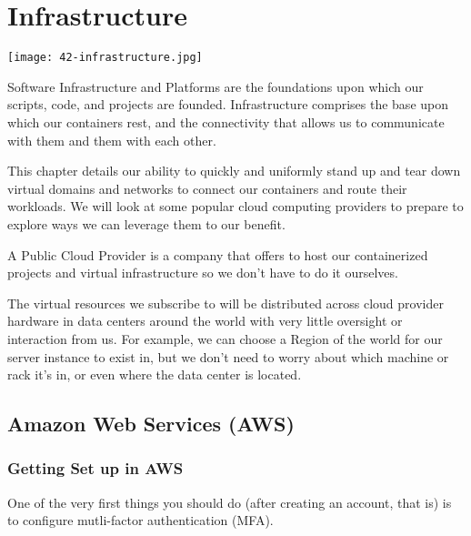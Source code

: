 \chapter{Infrastructure}

\justifying
\texttt{[image: 42-infrastructure.jpg]}

\justifying
Software Infrastructure and Platforms are the foundations upon which our
scripts, code, and projects are founded. Infrastructure comprises the
base upon which our containers rest, and the connectivity that allows us
to communicate with them and them with each other.

\justifying
This chapter details our ability to quickly and uniformly stand up and
tear down virtual domains and networks to connect our containers and
route their workloads. We will look at some popular cloud computing
providers to prepare to explore ways we can leverage them to our
benefit.

\justifying
A Public Cloud Provider is a company that offers to host our containerized
projects and virtual infrastructure so we don't have to do it ourselves.

\justifying
The virtual resources we subscribe to will be distributed across cloud
provider hardware in data centers around the world with very little
oversight or interaction from us. For example, we can choose a Region of
the world for our server instance to exist in, but we don't need to
worry about which machine or rack it's in, or even where the data center
is located.

\section{Amazon Web Services (AWS)}



\subsection{Getting Set up in AWS}

\justifying
One of the very first things you should do (after creating an account,
that is) is to configure mutli-factor authentication (MFA).

